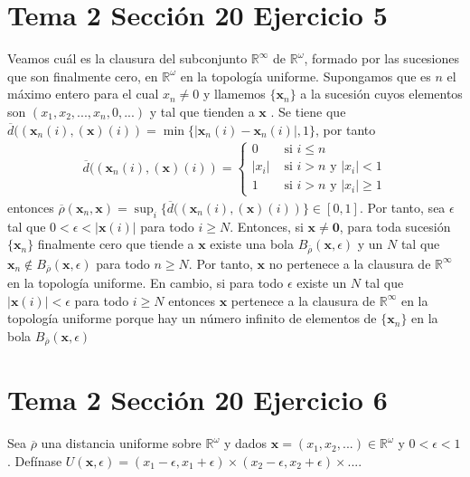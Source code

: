 \documentclass{article}
\newcommand{\vect}[1]{\boldsymbol{#1}}
\begin{document}
\section{Tema 2 Sección 20 Ejercicio 5}
Veamos cuál es la clausura del subconjunto $\mathbb{R}^\infty$ de $\mathbb{R}^\omega$, formado por las sucesiones que son finalmente cero, en $\mathbb{R}^\omega$ en la topología uniforme. Supongamos que es $n$ el máximo entero para
el cual $x_n \neq 0$ y llamemos $\{\vect{x}_n\}$ a la sucesión cuyos elementos son $(x_1, x_2, ..., x_n, 0, ...)$ y tal que tienden a $\vect{x}$ . Se tiene que $\overline{d}((\vect{x}_n(i),(\vect{x})(i))=\min\{|\vect{x}_n(i)-\vect{x}_n(i)|,1\}$, por tanto
\begin{eqnarray}
\overline{d}((\vect{x}_n(i),(\vect{x})(i))=\begin{cases}
0 &\text{ si }i\leq n\nonumber\\
|x_i|&\text{ si } i > n\text{ y } |x_i| <1 \nonumber\\
1 &\text{ si } i > n\text{ y } |x_i| \geq 1
\end{cases}
\nonumber
\end{eqnarray}
entonces $\overline{\rho}(\vect{x}_n, \vect{x})=\sup_i \{\overline{d}((\vect{x}_n(i),(\vect{x})(i))\}\in [0,1]$. Por tanto, sea $\epsilon$ tal que $0<\epsilon <| \vect{x}(i)|$ para todo $i\geq N$. Entonces, si $\vect{x}\neq \vect{0}$, para toda sucesión $\{\vect{x}_n\}$ finalmente cero que tiende a $\vect{x}$ existe una bola $B_{\overline{\rho}}(\vect{x},\epsilon)$ y un $N$ tal que $\vect{x}_n\notin B_{\overline{\rho}}(\vect{x},\epsilon)$ para todo $n\geq N$. Por tanto, $\vect{x}$ no pertenece a la clausura de $\mathbb{R}^\infty$ en la topología uniforme. En cambio, si para todo $\epsilon$ existe un $N$ tal que $|\vect{x}(i)|< \epsilon$ para todo $i\geq N$ entonces $\vect{x}$ pertenece a la clausura de $\mathbb{R}^\infty$ en la topología uniforme porque hay un número infinito de elementos de $\{\vect{x}_n\}$ en la bola $B_{\overline{\rho}}(\vect{x},\epsilon)$

\section{Tema 2 Sección 20 Ejercicio 6}
Sea $\overline{\rho}$ una distancia uniforme sobre $\mathbb{R}^\omega$ y dados $\vect{x}=(x_1,x_2,...)\in \mathbb{R}^\omega$ y $0<\epsilon<1$. Defínase $U(\vect{x},\epsilon)=(x_1-\epsilon, x_1+\epsilon)\times (x_2-\epsilon, x_2+\epsilon)\times...$.
\end{document}
